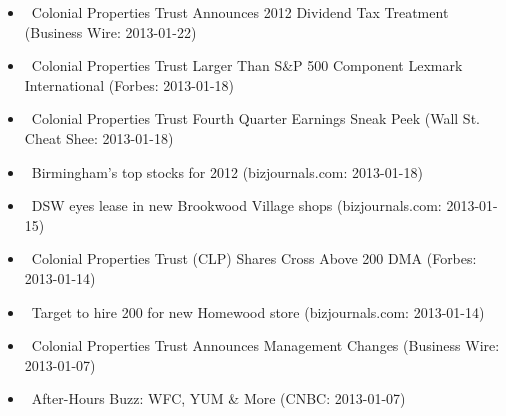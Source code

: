 \documentclass[11pt,asymmetric]{article}
\begin{document}
\begin{itemize}
\item\ Colonial Properties Trust Announces 2012 Dividend Tax Treatment (Business Wire: 2013-01-22)
\item\ Colonial Properties Trust Larger Than S\&P 500 Component Lexmark International (Forbes: 2013-01-18)
\item\ Colonial Properties Trust Fourth Quarter Earnings Sneak Peek (Wall St. Cheat Shee: 2013-01-18)
\item\ Birmingham's top stocks for 2012 (bizjournals.com: 2013-01-18)
\item\ DSW eyes lease in new Brookwood Village shops (bizjournals.com: 2013-01-15)
\item\ Colonial Properties Trust (CLP) Shares Cross Above 200 DMA (Forbes: 2013-01-14)
\item\ Target to hire 200 for new Homewood store (bizjournals.com: 2013-01-14)
\item\ Colonial Properties Trust Announces Management Changes (Business Wire: 2013-01-07)
\item\ After-Hours Buzz: WFC, YUM \& More (CNBC: 2013-01-07)
\end{itemize}
\end{document}
